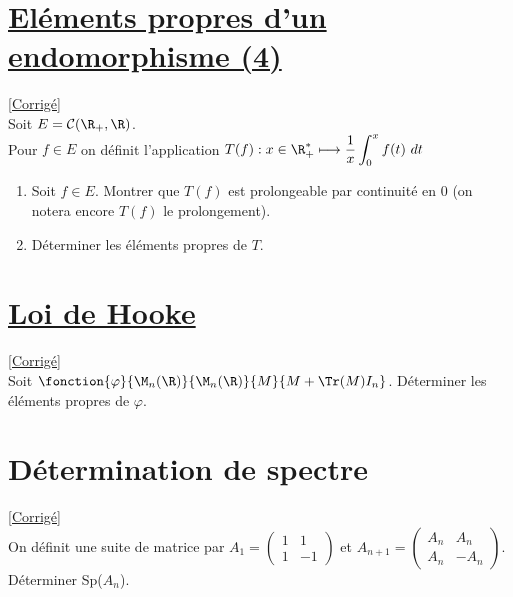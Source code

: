 \documentclass[8pt]{book}
\begin{document}
	\section{\underline{Eléments propres d'un endomorphisme (4)} }
	\label{Eléments propres d'un endomorphismes (4)}
	\textcolor{blue}{\hyperref[Eléments propres d'un endomorphisme (4) corrigé]{[Corrigé]}}\\
	Soit $E=\mathcal{C}(\R_+,\R)$.\\
	Pour $f\in E$ on définit l'application $T(f):x\in \R_+^*\longmapsto \displaystyle{\frac{1}{x}\int_0^x{f(t)\ dt}}$
	\begin{enumerate}
		\item Soit $f\in E$. Montrer que $T(f)$ est prolongeable par continuité en $0$ (on notera encore $T(f)$ le prolongement).
		\item Déterminer les éléments propres de $T$.
	\end{enumerate}
	
	\section{\underline{Loi de Hooke} }
	\label{Loi de Hooke}
	\textcolor{blue}{\hyperref[Loi de Hooke corrigé]{[Corrigé]}}\\
	Soit $\fonction{\varphi}{\M_n(\R)}{\M_n(\R)}{M}{M+\Tr(M)I_n}$. Déterminer les éléments propres de $\varphi$.
	
	\section{Détermination de spectre }
	\label{Détermination de spectre}
	\textcolor{blue}{\hyperref[Détermination de spectre corrigé]{[Corrigé]}}\\
	On définit une suite de matrice par $A_1=\begin{pmatrix}1&1\\1&-1\end{pmatrix}$ et $A_{n+1}=\left(\begin{array}{c|c}
		A_n&A_n\\
		\hline
		A_n&-A_n
	\end{array}\right)$.\\
	Déterminer Sp($A_n$).
	
\end{document}
